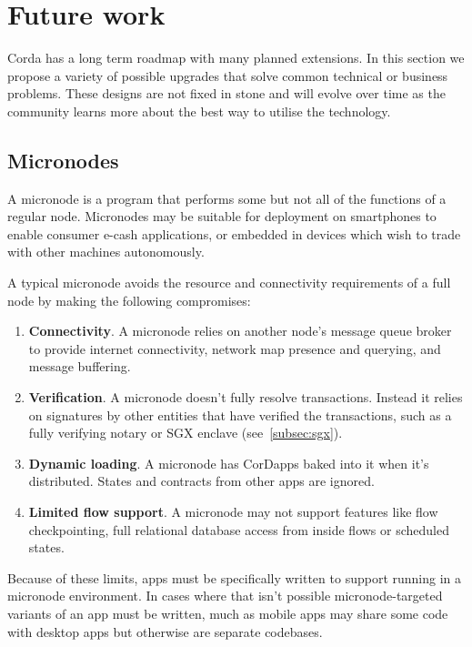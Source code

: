 \documentclass{article}
\begin{document}
\section{Future work}

Corda has a long term roadmap with many planned extensions. In this section we propose a variety of possible upgrades
that solve common technical or business problems. These designs are not fixed in stone and will evolve over time as
the community learns more about the best way to utilise the technology.

\subsection{Micronodes}\label{subsec:micronodes}

A micronode is a program that performs some but not all of the functions of a regular node. Micronodes may be suitable
for deployment on smartphones to enable consumer e-cash applications, or embedded in devices which wish to trade with
other machines autonomously.

A typical micronode avoids the resource and connectivity requirements of a full node by making the following compromises:

\begin{enumerate}

    \item \textbf{Connectivity}. A micronode relies on another node's message queue broker to provide internet
    connectivity, network map presence and querying, and message buffering.

    \item \textbf{Verification}. A micronode doesn't fully resolve transactions. Instead it relies on signatures by
    other entities that have verified the transactions, such as a fully verifying notary or SGX enclave
    (see~\cref{subsec:sgx}).

    \item \textbf{Dynamic loading}. A micronode has CorDapps baked into it when it's distributed. States and
    contracts from other apps are ignored.

    \item \textbf{Limited flow support}. A micronode may not support features like flow checkpointing, full
    relational database access from inside flows or scheduled states.

\end{enumerate}

Because of these limits, apps must be specifically written to support running in a micronode environment. In cases where
that isn't possible micronode-targeted variants of an app must be written, much as mobile apps may share some code with
desktop apps but otherwise are separate codebases.
\end{document}
